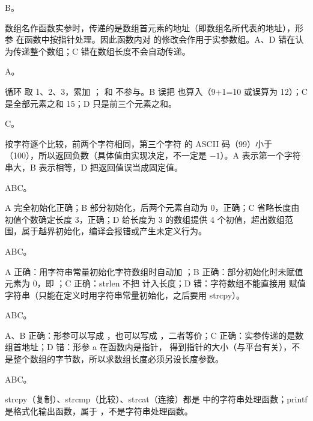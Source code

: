 \documentclass[a4paper,11pt]{article}
\begin{document}
\q B。\begin{analysis}数组名作函数实参时，传递的是数组首元素的地址（即数组名所代表的地址），形参  在函数中按指针处理。因此函数内对  的修改会作用于实参数组。A、D 错在认为传递整个数组；C 错在数组长度不会自动传递。\end{analysis}

\q A。\begin{analysis}循环  取 1、2、3，累加 ； 和  不参与。B 误把  也算入（9+1=10 或误算为 12）；C 是全部元素之和 15；D 只是前三个元素之和。\end{analysis}

\q C。\begin{analysis} 按字符逐个比较，前两个字符相同，第三个字符  的 ASCII 码（99）小于 （100），所以返回负数（具体值由实现决定，不一定是 $-1$）。A 表示第一个字符串大，B 表示相等，D 把返回值误当成固定值。\end{analysis}


\q ABC。\begin{analysis}A 完全初始化正确；B 部分初始化，后两个元素自动为 0，正确；C 省略长度由初值个数确定长度 3，正确；D 给长度为 3 的数组提供 4 个初值，超出数组范围，属于越界初始化，编译会报错或产生未定义行为。\end{analysis}

\q ABC。\begin{analysis}A 正确：用字符串常量初始化字符数组时自动加 ；B 正确：部分初始化时未赋值元素为 0，即 ；C 正确：strlen 不把  计入长度；D 错：字符数组不能直接用 \code{=} 赋值字符串（只能在定义时用字符串常量初始化，之后要用 strcpy）。\end{analysis}

\q ABC。\begin{analysis}A、B 正确：形参可以写成 ，也可以写成 ，二者等价；C 正确：实参传递的是数组首地址；D 错：形参 a 在函数内是指针， 得到指针的大小（与平台有关），不是整个数组的字节数，所以求数组长度必须另设长度参数。\end{analysis}

\q ABC。\begin{analysis}strcpy（复制）、strcmp（比较）、strcat（连接）都是  中的字符串处理函数；printf 是格式化输出函数，属于 ，不是字符串处理函数。\end{analysis}
\end{document}
